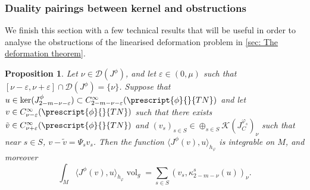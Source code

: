 \documentclass{article}
\numberwithin{equation}{section}        %
\theoremstyle{bfnote}
\newtheorem{prop}[thm]{Proposition}         %
\theoremstyle{definition}
\theoremstyle{bfremark}
\DeclareMathOperator{\vol}{vol}                 %
\begin{document}
    \subsubsection{Duality pairings between kernel and obstructions}	\label{subsubsec: pairing}

We finish this section with a few technical results that will be useful in order to analyse the obstructions of the linearised deformation problem in \cref{sec: The deformation theorem}.

\begin{prop}
    Let $\nu \in \mathcal{D}(J^\phi)$, and let $\varepsilon \in (0,\mu)$ such that $[\nu-\varepsilon, \nu+\varepsilon] \cap \mathcal{D}(J^\phi) = \{\nu\}$. Suppose that $u \in \ker(J^\phi_{2-m-\nu-\varepsilon}) \subset C^\infty_{2-m-\nu-\varepsilon}(\prescript{\phi}{}{TN})$ and let $ v \in C^\infty_{\nu-\varepsilon}(\prescript{\phi}{}{TN})$ such that there exists $\tilde v \in C^\infty_{\nu+\varepsilon}(\prescript{\phi}{}{TN})$ and $(v_s)_{s \in S} \in \oplus_{s \in S} \mathcal{K}(J^{\varphi_s}_C)_\nu$ such that near $s \in S$, $v - \tilde v = \Psi_s v_s$.  Then the function $\langle J^\phi(v), u \rangle_{h_\varphi}$ is integrable on $M$, and moreover
    \begin{equation*}
        \int_M \langle J^\phi(v), u \rangle_{h_\varphi} \vol_{g} = \sum_{s \in S} (v_s,\kappa_{2-m-\nu}^s(u))_\nu .
    \end{equation*}
\end{prop}
\end{document}
